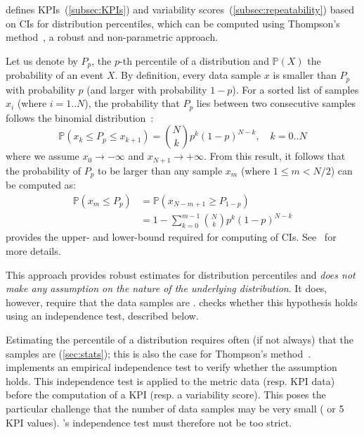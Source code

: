 \triscale defines KPIs~(\cref{subsec:KPIs}) and variability scores~(\cref{subsec:repeatability}) based on CIs for distribution percentiles, which can be computed using Thompson's method~\cite{thompson1936Confidence}, a robust and non-parametric approach.

Let us denote by $P_p$, the $p$-th percentile of a distribution and $\mathbb{P}(X)$ the probability of an event $X$.
By definition, every data sample $x$ is smaller than $P_p$ with probability $p$ (and larger with probability $1-p$).
For a sorted list of \iid samples $x_i$ (where $i = 1 .. N$), the probability that $P_p$ lies between two consecutive samples follows the binomial distribution~\cite{thompson1936Confidence}:
\begin{equation}
    \mathbb{P}(x_k \leq P_p \leq x_{k+1}) = \binom{N}{k} p^k(1-p)^{N-k}, \quad k = 0 .. N
\end{equation}
where we assume $x_0 \rightarrow - \infty$ and $x_{N+1} \rightarrow +\infty$. From this result, it follows that the probability of $P_p$ to be larger than any sample $x_m$ (where $1\leq m < N/2$) can be computed as:
\begin{align}
  \nonumber
    \mathbb{P}(x_m \leq P_p)
      &= \mathbb{P}(x_{N-m+1} \geq P_{1-p})\\
  \label{eq:lb}
      &= 1 - \sum_{k=0}^{m-1} \binom{N}{k} p^k(1-p)^{N-k}
\end{align}
 provides the upper- and lower-bound required for computing of CIs.
See~\cite{schmid2014measuring} for more details.

This approach provides robust estimates for distribution percentiles and \emph{does not make any assumption on the nature of the underlying distribution}.
It does, however, require that the data samples are \iid. \triscale checks whether this hypothesis holds using an independence test, described below.

Estimating the percentile of a distribution requires often (if not always) that the samples are \iid (\cref{sec:stats}); this is also the case for Thompson's method~\cite{thompson1936Confidence}.
\triscale implements an empirical independence test to verify whether the \iid assumption holds.
This independence test is applied to the metric data (resp. KPI data) before the computation of a KPI (resp. a variability score).
This poses the particular challenge that the number of data samples may be very small ( or 5 KPI values). \triscale's independence test must therefore not be too strict.


